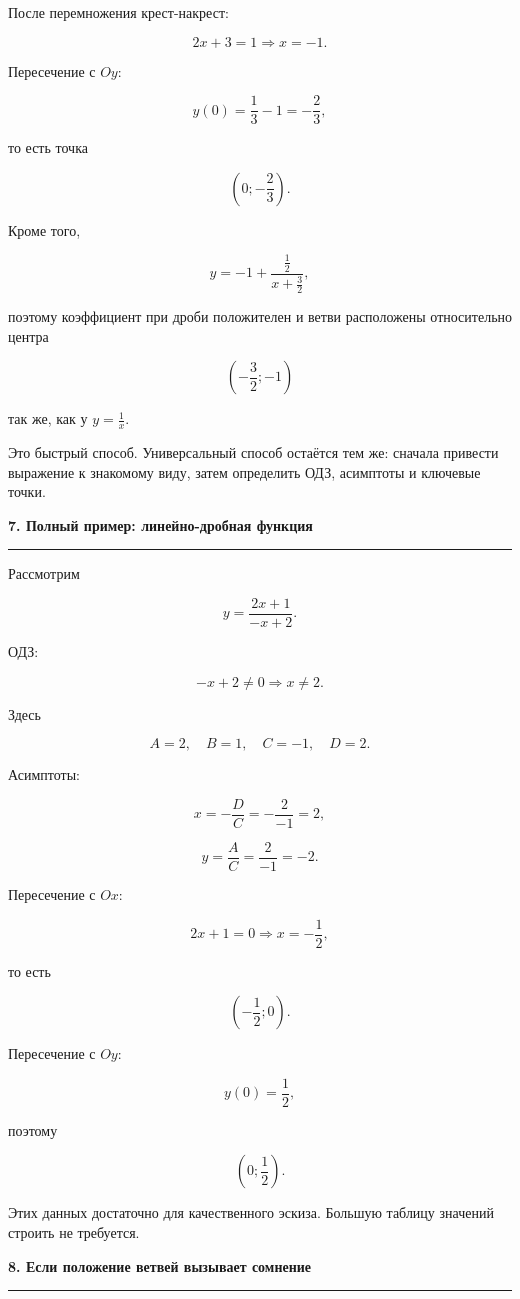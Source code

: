 \documentclass[a4paper,12pt]{article}
\newcommand{\sectiontitle}[1]{%
    \par\vspace{0.65em}
    {\Large\bfseries\color{darkaccent}#1}\par
    \vspace{0.15em}
    {\color{accent}\rule{\linewidth}{0.65pt}}\par
    \vspace{0.3em}
}
\begin{document}
После перемножения крест-накрест:

\[
2x+3=1
\Longrightarrow
\boxed{x=-1}.
\]

Пересечение с \(Oy\):

\[
y(0)=\frac13-1=-\frac23,
\]

то есть точка

\[
\boxed{\left(0;-\frac23\right)}.
\]

Кроме того,

\[
y=-1+\frac{\frac12}{x+\frac32},
\]

поэтому коэффициент при дроби положителен и ветви расположены относительно
центра

\[
\left(-\frac32;-1\right)
\]

так же, как у \(y=\frac1x\).

Это быстрый способ. Универсальный способ остаётся тем же: сначала привести
выражение к знакомому виду, затем определить ОДЗ, асимптоты и ключевые точки.

\sectiontitle{7. Полный пример: линейно-дробная функция}

Рассмотрим

\[
y=\frac{2x+1}{-x+2}.
\]

ОДЗ:

\[
-x+2\ne0
\Longrightarrow
\boxed{x\ne2}.
\]

Здесь

\[
A=2,
\quad
B=1,
\quad
C=-1,
\quad
D=2.
\]

Асимптоты:

\[
x=-\frac{D}{C}
=-\frac{2}{-1}
=\boxed{2},
\]

\[
y=\frac{A}{C}
=\frac{2}{-1}
=\boxed{-2}.
\]

Пересечение с \(Ox\):

\[
2x+1=0
\Longrightarrow
x=-\frac12,
\]

то есть

\[
\boxed{\left(-\frac12;0\right)}.
\]

Пересечение с \(Oy\):

\[
y(0)=\frac12,
\]

поэтому

\[
\boxed{\left(0;\frac12\right)}.
\]

Этих данных достаточно для качественного эскиза. Большую таблицу значений
строить не требуется.

\sectiontitle{8. Если положение ветвей вызывает сомнение}
\end{document}
